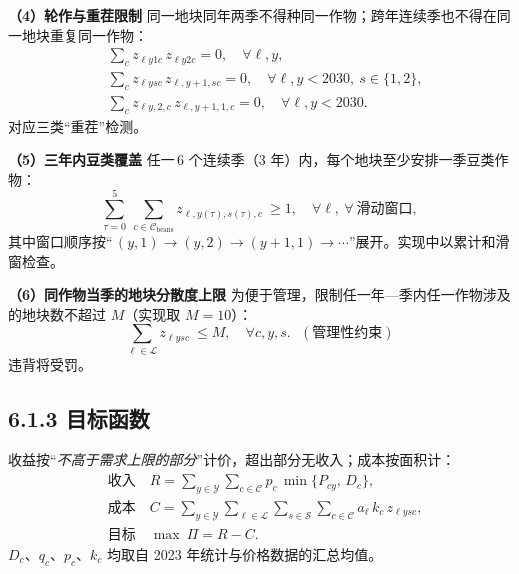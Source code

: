 \textbf{（4）轮作与重茬限制} 
同一地块同年两季不得种同一作物；跨年连续季也不得在同一地块重复同一作物：
\begin{align}
&\sum_{c} z_{\ell y 1 c}\,z_{\ell y 2 c}=0,\quad \forall \ell,y, \\
&\sum_{c} z_{\ell y s c}\,z_{\ell,y+1, s c}=0,\quad \forall \ell,y<2030,\ s\in\{1,2\},\\
&\sum_{c} z_{\ell y,2,c}\,z_{\ell,y+1,1,c}=0,\quad \forall \ell,y<2030.
\end{align}
对应三类“重茬”检测。

\textbf{（5）三年内豆类覆盖} 
任一\,$6$ 个连续季（3 年）内，每个地块至少安排一季豆类作物：
\[
\sum_{\tau=0}^{5}\ \sum_{c\in \mathcal C_{\text{beans}}} z_{\ell, y(\tau), s(\tau), c}\ \ge 1,\quad \forall \ell,\ \forall\ \text{滑动窗口},
\]
其中窗口顺序按“\,$(y,1)\!\to\!(y,2)\!\to\!(y\!+\!1,1)\!\to\!\cdots$”展开。实现中以累计和滑窗检查。

\textbf{（6）同作物当季的地块分散度上限} 
为便于管理，限制任一年—季内任一作物涉及的地块数不超过 $M$（实现取 $M=10$）：
\[
\sum_{\ell\in\mathcal L} z_{\ell y s c}\ \le M,\quad \forall c,y,s.\ \ \ (\text{管理性约束})
\]
违背将受罚。
\subsection{6.1.3 目标函数}
收益按“\emph{不高于需求上限的部分}”计价，超出部分无收入；成本按面积计：
\begin{align}
&\text{收入}\quad R=\sum_{y\in\mathcal Y}\sum_{c\in\mathcal C} p_c\, \min\{P_{cy},\, D_c\},\\
&\text{成本}\quad C=\sum_{y\in\mathcal Y}\sum_{\ell\in\mathcal L}\sum_{s\in\mathcal S}\sum_{c\in\mathcal C} a_\ell\, k_c\, z_{\ell y s c},\\
&\text{目标}\quad \max\ \Pi=R-C.
\end{align}
$D_c$、$q_c$、$p_c$、$k_c$ 均取自 2023 年统计与价格数据的汇总均值。

